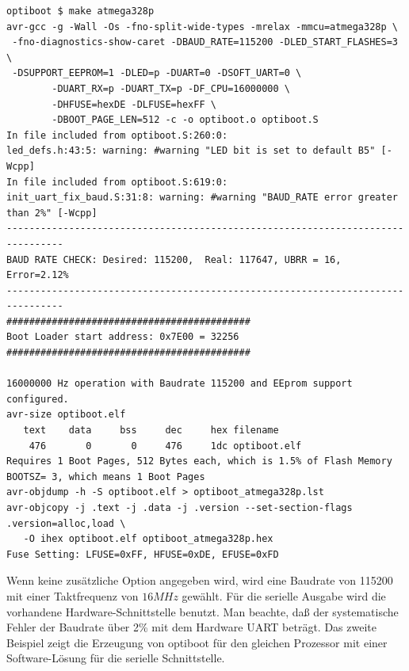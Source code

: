 \begin{verbatim}
optiboot $ make atmega328p
avr-gcc -g -Wall -Os -fno-split-wide-types -mrelax -mmcu=atmega328p \
 -fno-diagnostics-show-caret -DBAUD_RATE=115200 -DLED_START_FLASHES=3 \
 -DSUPPORT_EEPROM=1 -DLED=p -DUART=0 -DSOFT_UART=0 \
        -DUART_RX=p -DUART_TX=p -DF_CPU=16000000 \
        -DHFUSE=hexDE -DLFUSE=hexFF \
        -DBOOT_PAGE_LEN=512 -c -o optiboot.o optiboot.S
In file included from optiboot.S:260:0:
led_defs.h:43:5: warning: #warning "LED bit is set to default B5" [-Wcpp]
In file included from optiboot.S:619:0:
init_uart_fix_baud.S:31:8: warning: #warning "BAUD_RATE error greater than 2%" [-Wcpp]
--------------------------------------------------------------------------------
BAUD RATE CHECK: Desired: 115200,  Real: 117647, UBRR = 16, Error=2.12%
--------------------------------------------------------------------------------
###########################################
Boot Loader start address: 0x7E00 = 32256
###########################################

16000000 Hz operation with Baudrate 115200 and EEprom support configured.
avr-size optiboot.elf
   text	   data	    bss	    dec	    hex	filename
    476	      0	      0	    476	    1dc	optiboot.elf
Requires 1 Boot Pages, 512 Bytes each, which is 1.5% of Flash Memory
BOOTSZ= 3, which means 1 Boot Pages
avr-objdump -h -S optiboot.elf > optiboot_atmega328p.lst
avr-objcopy -j .text -j .data -j .version --set-section-flags .version=alloc,load \
   -O ihex optiboot.elf optiboot_atmega328p.hex
Fuse Setting: LFUSE=0xFF, HFUSE=0xDE, EFUSE=0xFD
\end{verbatim}

Wenn keine zusätzliche Option angegeben wird, wird eine Baudrate von 115200 mit einer Taktfrequenz von \(16 MHz\) gewählt.
Für die serielle Ausgabe wird die vorhandene Hardware-Schnittstelle benutzt. 
Man beachte, daß der systematische Fehler der Baudrate über 2\% mit dem Hardware UART beträgt.
Das zweite Beispiel zeigt die Erzeugung von optiboot für den gleichen Prozessor mit einer Software-Lösung
für die serielle Schnittstelle.

